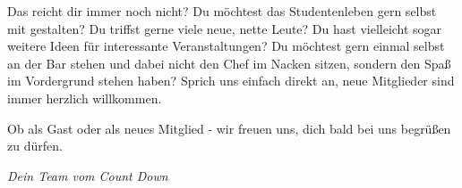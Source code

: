Das reicht dir immer noch nicht?
Du möchtest das Studentenleben gern selbst mit gestalten?
Du triffst gerne viele neue, nette Leute?
Du hast vielleicht sogar weitere Ideen für interessante Veranstaltungen?
Du möchtest gern einmal selbst an der Bar stehen und dabei nicht den Chef im Nacken sitzen, sondern den Spaß im Vordergrund stehen haben?
Sprich uns einfach direkt an, neue Mitglieder sind immer herzlich willkommen.

Ob als Gast oder als neues Mitglied - wir freuen uns, dich bald bei uns begrüßen zu dürfen.

\textit{Dein Team vom Count Down}